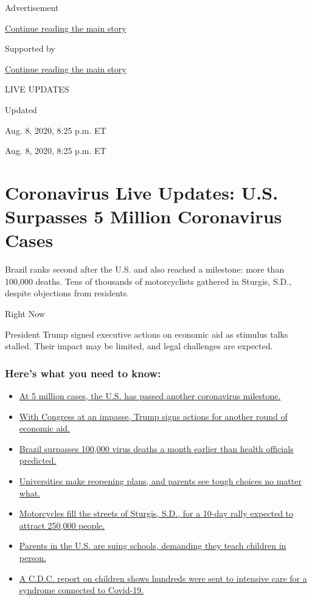 Advertisement

\protect\hyperlink{after-top}{Continue reading the main story}

Supported by

\protect\hyperlink{after-sponsor}{Continue reading the main story}

LIVE UPDATES

Updated~

Aug. 8, 2020, 8:25 p.m. ET

Aug. 8, 2020, 8:25 p.m. ET

\hypertarget{coronavirus-live-updates-us-surpasses-5-million-coronavirus-cases}{%
\section{Coronavirus Live Updates: U.S. Surpasses 5 Million Coronavirus
Cases}\label{coronavirus-live-updates-us-surpasses-5-million-coronavirus-cases}}

Brazil ranks second after the U.S. and also reached a milestone: more
than 100,000 deaths. Tens of thousands of motorcyclists gathered in
Sturgis, S.D., despite objections from residents.

Right Now

President Trump signed executive actions on economic aid as stimulus
talks stalled. Their impact may be limited, and legal challenges are
expected.

\hypertarget{heres-what-you-need-to-know}{%
\subsubsection{Here's what you need to
know:}\label{heres-what-you-need-to-know}}

\begin{itemize}
\tightlist
\item
  \protect\hyperlink{link-697eb3e1}{At 5 million cases, the U.S. has
  passed another coronavirus milestone.}
\item
  \protect\hyperlink{link-5b7b4fa2}{With Congress at an impasse, Trump
  signs actions for another round of economic aid.}
\item
  \protect\hyperlink{link-680eccee}{Brazil surpasses 100,000 virus
  deaths a month earlier than health officials predicted.}
\item
  \protect\hyperlink{link-7bd2f2ea}{Universities make reopening plans,
  and parents see tough choices no matter what.}
\item
  \protect\hyperlink{link-6d42ce45}{Motorcycles fill the streets of
  Sturgis, S.D., for a 10-day rally expected to attract 250,000 people.}
\item
  \protect\hyperlink{link-458f8def}{Parents in the U.S. are suing
  schools, demanding they teach children in person.}
\item
  \protect\hyperlink{link-57c61e05}{A C.D.C. report on children shows
  hundreds were sent to intensive care for a syndrome connected to
  Covid-19.}
\end{itemize}

